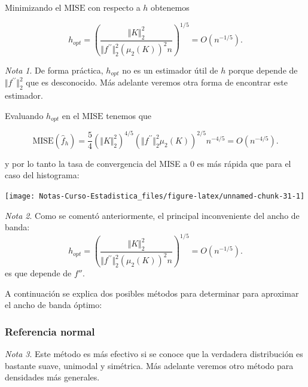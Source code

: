 \documentclass[
  12pt,
]{book}
\theoremstyle{definition}
\theoremstyle{definition}
\theoremstyle{definition}
\theoremstyle{definition}
\theoremstyle{remark}
\newtheorem*{remark}{Nota}
\begin{document}
Minimizando el \(\mathrm{MISE}\) con respecto a \(h\) obtenemos

\begin{equation*}
h_{opt}=\left(\frac{\Vert K\Vert_{2}^{2}}{\Vert f^{\prime\prime}\Vert_{2}^{2}\left(\mu_{2}(K)\right)^{2}n}\right)^{1/5}=O\left( n^{-1/5} \right).
\end{equation*}

\begin{remark}
De forma práctica, \(h_{opt}\) no es un estimador útil de \(h\) porque depende de \(\Vert f^{\prime\prime}\Vert_{2}^{2}\) que es desconocido. Más adelante veremos otra forma de encontrar este estimador.
\end{remark}

Evaluando \(h_{opt}\) en el \(\mathrm{MISE}\) tenemos que

\begin{equation*}
\mathrm{MISE}(\hat{f}_{h})=\frac{5}{4}\left(\Vert K\Vert_{2}^{2}\right)^{4/5}\left(\Vert f^{\prime\prime}\Vert_{2}^{2}\mu_{2}(K)\right)^{2/5}n^{-4/5} = O\left( n^{-4/5} \right).
\end{equation*}

y por lo tanto la tasa de convergencia del MISE a 0 es más rápida que para el caso del histograma:

\begin{center}\texttt{[image: Notas-Curso-Estadistica\_files/figure-latex/unnamed-chunk-31-1]} \end{center}

\begin{remark}
Como se comentó anteriormente, el principal inconveniente del ancho de banda:
\begin{equation*}
h_{opt}=\left(\frac{\Vert K\Vert_{2}^{2}}{\Vert f^{\prime\prime}\Vert_{2}^{2}\left(\mu_{2}(K)\right)^{2}n}\right)^{1/5}=O\left( n^{-1/5} \right).
\end{equation*}
es que depende de \(f''\).
\end{remark}

A continuación se explica dos posibles métodos para determinar para aproximar el ancho de banda óptimo:

\hypertarget{referencia-normal}{%
\subsubsection{Referencia normal}\label{referencia-normal}}

\begin{remark}
Este método es más efectivo si se conoce que la verdadera distribución es bastante suave, unimodal y simétrica. Más adelante veremos otro método para densidades más generales.
\end{remark}
\end{document}

